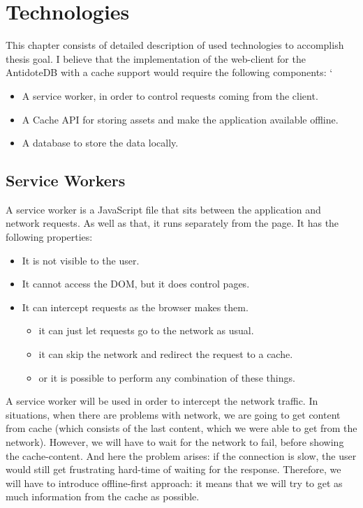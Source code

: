 \chapter{Technologies}
\label{Technologies}

This chapter consists of detailed description of used technologies to accomplish thesis goal.
I believe that the implementation of the web-client for the AntidoteDB with a cache support would require the following components:
`
\begin{itemize}
\item{A service worker, in order to control requests coming from the client.}
\item{A Cache API for storing assets and make the application available offline.}
\item{A database to store the data locally}.

\end{itemize}

\section{Service Workers}

A service worker\cite{Gaunt:2018:Online} is a JavaScript file that sits between the application and network requests. As well as that, it runs separately from the page. It has the following properties:

\begin{itemize}
\item{It is not visible to the user.}
\item{It cannot access the DOM, but it does control pages.}
\item{It can intercept requests as the browser makes them.}
\begin{itemize}
\item{it can just let requests go to the network as usual.}
\item{it can skip the network and redirect the request to a cache.}
\item{or it is possible to perform any combination of these things.}

\end{itemize}
\end{itemize}

A service worker will be used in order to intercept the network traffic. In situations, when there are problems with network, we are going to get content from cache (which consists of the last content, which we were able to get from the network). However, we will have to wait for the network to fail, before showing the cache-content. And here the problem arises: if the connection is slow, the user would still get frustrating hard-time of waiting for the response. Therefore, we will have to introduce offline-first approach: it means that we will try to get as much information from the cache as possible. 

